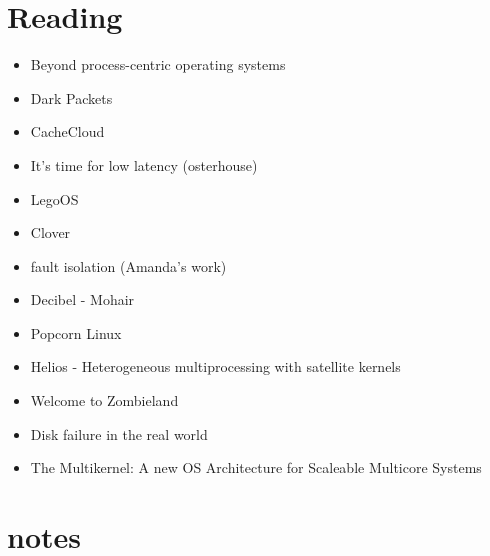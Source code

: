 \section{Reading}
\label{sec:reading}
\begin{itemize}
    \item{Beyond process-centric operating systems}~\cite{189914}\rpaper{}
    \item{Dark Packets}\rabstract{}
    \item{CacheCloud}~\cite{cachecloud}\rintro{+}
    \item{It's time for low latency (osterhouse)}
    \item{LegoOS}\cite{legoos}\rpaper{}
    \item {Clover}\cite{clover}\rpaper{}
    \item{fault isolation (Amanda's work)}\rintro{}
    \item{Decibel - Mohair}\rabstract{}
    \item{Popcorn Linux}
    \item{Helios - Heterogeneous multiprocessing with satellite kernels}~\cite{helios}\rabstract{}
    \item{Welcome to Zombieland}~\cite{zombieland}\rintro{}
    \item{Disk failure in the real world}~\cite{Schroeder:2007:DFR:1267903.1267904}\rabstract{}
    \item{The Multikernel: A new OS Architecture for Scaleable Multicore Systems}~\cite{the-multikernel}\rabstract{}

\end{itemize}


\section{notes}
\label{sec:thoughts}

